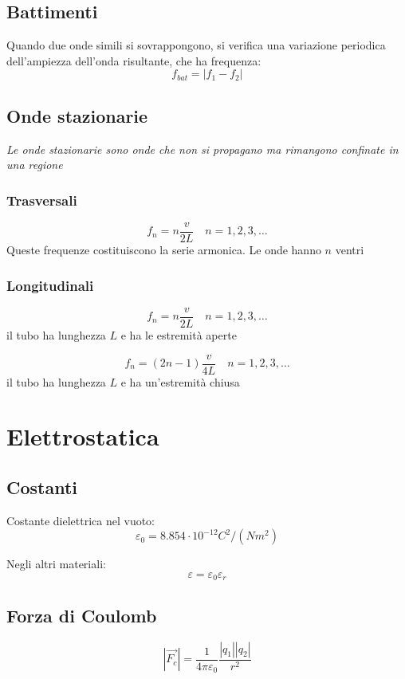 \documentclass[12pt]{article}
\begin{document}
\subsection{Battimenti}
Quando due onde simili si sovrappongono, si verifica una variazione periodica dell'ampiezza dell'onda risultante, che ha frequenza:
$$ f_{bat} = |f_1 - f_2| $$

\subsection{Onde stazionarie}
\textit{Le onde stazionarie sono onde che non si propagano ma rimangono confinate in una regione}

\subsubsection{Trasversali}
$$ f_n = n \frac{v}{2L} \hspace{1em} n = 1,2,3,\dots $$
Queste frequenze costituiscono la serie armonica. Le onde hanno $n$ ventri

\subsubsection{Longitudinali}
$$ f_n = n \frac{v}{2L} \hspace{1em} n = 1,2,3,\dots $$
il tubo ha lunghezza $L$ e ha le estremità aperte

\vspace{1em}
$$ f_n = (2n-1) \frac{v}{4L} \hspace{1em} n = 1,2,3,\dots $$
il tubo ha lunghezza $L$ e ha un'estremità chiusa

\newpage
\section{Elettrostatica}

\subsection{Costanti}
Costante dielettrica nel vuoto:
$$ \varepsilon_0 = 8.854 \cdot 10^{-12} C^2/(Nm^2) $$

Negli altri materiali:
$$ \varepsilon = \varepsilon_0 \varepsilon_r $$

\subsection{Forza di Coulomb}
$$ |\vec{F_c}| = \frac{1}{4\pi\varepsilon_0}\frac{|q_1||q_2|}{r^2} $$
\end{document}
